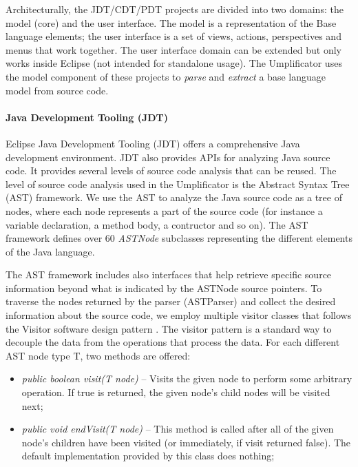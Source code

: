 Architecturally, the JDT/CDT/PDT projects are divided into two domains: the model (core) and the user interface. The model is a representation of the Base language elements; the user interface is a set of views, actions, perspectives and menus that work together. The user interface domain can be extended but only works inside Eclipse (not intended for standalone usage).  The Umplificator uses the model component of these projects to \textit{parse} and \textit{extract} a base language model from source code. 

\paragraph*{Java Development Tooling (JDT)}

 Eclipse Java Development Tooling (JDT) \cite{jdtProject} offers a comprehensive Java development environment. JDT also provides APIs for analyzing Java source code. It provides several levels of source code analysis that can be reused. The level of source code analysis used in the Umplificator is the Abstract Syntax Tree (AST) framework. We use the AST to analyze the Java source code as a tree of nodes, where each node represents a part of the source code (for instance a variable declaration, a method body, a contructor and so on). The AST framework defines over 60 \textit{ASTNode} \cite{astnodeapi} subclasses representing the different elements of the Java language. 
 
  
The AST framework includes also interfaces that help retrieve specific source information beyond what is indicated by the ASTNode source pointers. To traverse the nodes returned by the parser (ASTParser) and collect the desired information about the source code, we employ multiple visitor classes that follows the Visitor software design pattern \cite{gamma1994design}. 
The visitor pattern is a standard way to decouple the data from the operations that process the data.
For each different AST node type T, two methods are offered:

\begin{itemize}

\item  \textit{public boolean visit(T node)} -- Visits the given node to perform some arbitrary operation. If true is returned, the given node's child nodes will be visited next;
\item  \textit{public void endVisit(T node)} --  This method is called after all of the given node's children have been visited (or immediately, if visit returned false). The default implementation provided by this class does nothing;
\end{itemize}

